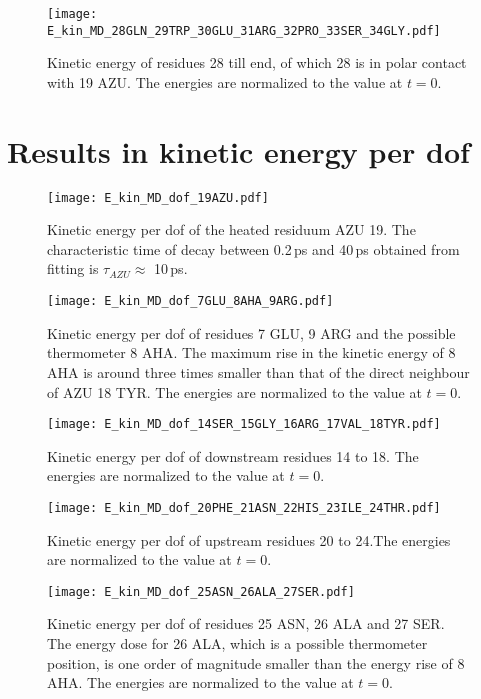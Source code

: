 \documentclass[11pt, a4paper]{report}
\begin{document}
\begin{figure}[h]
  \centering
  \texttt{[image: E\_kin\_MD\_28GLN\_29TRP\_30GLU\_31ARG\_32PRO\_33SER\_34GLY.pdf]}
  \caption{Kinetic energy of residues 28 till end, of which 28 is in polar contact
  with 19 AZU. The energies are normalized to the value at $t=0$.}
  \label{fig:E_kin_MD_28GLN_29TRP_30GLU_31ARG_32PRO_33SER_34GLY}
\end{figure}

\section{Results in kinetic energy per dof}

\begin{figure}[h]
  \centering
  \texttt{[image: E\_kin\_MD\_dof\_19AZU.pdf]}
  \caption{Kinetic energy per dof of the heated residuum AZU 19. The characteristic time
    of decay between 0.2\,ps and 40\,ps obtained from fitting is $\tau_{AZU}
  \approx$ 10\,ps.}
  \label{fig:E_kin_MD_dof_19}
\end{figure}

\begin{figure}[h]
  \centering
  \texttt{[image: E\_kin\_MD\_dof\_7GLU\_8AHA\_9ARG.pdf]}
  \caption{Kinetic energy per dof of residues 7 GLU, 9 ARG and the possible thermometer
  8 AHA. The maximum rise in the kinetic energy of 8 AHA is around three times smaller
than that of the direct neighbour of AZU 18 TYR. The energies are normalized to the value at $t=0$. }
  \label{fig:E_kin_MEQ_9ARG_10MET_11SER_12ARG}
\end{figure}

\begin{figure}[h]
  \centering
  \texttt{[image: E\_kin\_MD\_dof\_14SER\_15GLY\_16ARG\_17VAL\_18TYR.pdf]}
  \caption{Kinetic energy per dof of downstream residues 14 to 18. The energies are
  normalized to the value at $t=0$.}
  \label{fig:E_kin_MD_dof_15_16_17_18}
\end{figure}

\begin{figure}[h]
  \centering
  \texttt{[image: E\_kin\_MD\_dof\_20PHE\_21ASN\_22HIS\_23ILE\_24THR.pdf]}
  \caption{Kinetic energy per dof of upstream residues 20 to 24.The energies are normalized to the value at $t=0$.}
  \label{fig:E_kin_MD_dof_20_21_22_23}
\end{figure}

\begin{figure}[h]
  \centering
  \texttt{[image: E\_kin\_MD\_dof\_25ASN\_26ALA\_27SER.pdf]}
  \caption{Kinetic energy per dof of residues 25 ASN, 26 ALA and 27 SER. The energy
  dose for 26 ALA, which is a possible thermometer position, is one order of
magnitude smaller than the energy rise of 8 AHA. The energies are normalized to
the value at $t=0$.}
  \label{fig:name}
\end{figure}
\end{document}
